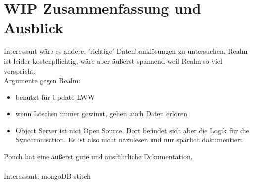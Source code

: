 \chapter{\label{chap:fazit}WIP Zusammenfassung und Ausblick}
Interessant wäre es andere, 'richtige' Datenbanklösungen zu untersuchen. 
Realm ist leider kostenpflichtig, wäre aber äußerst spannend weil Realm so viel verspricht.\\
Argumente gegen Realm:
\begin{itemize}
  \item benutzt für Update LWW
  \item wenn Löschen immer gewinnt, gehen auch Daten erloren
  \item Object Server ist nict Open Source. Dort befindet sich aber die Logik für die Synchronisation. Es ist also nicht nazulesen und nur spärlich dokumentiert
\end{itemize}
Pouch hat eine äüßerst gute und ausführliche Dokumentation.\\\\
Interessant: mongoDB stitch 